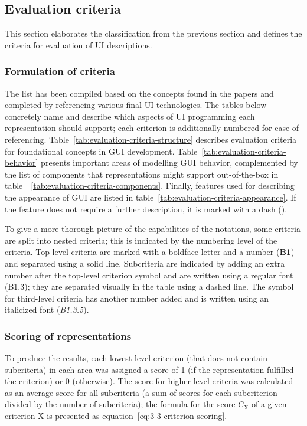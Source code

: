 \subsection{Evaluation criteria}\label{subsec:evaluation-criteria}

This section elaborates the classification from the previous section and defines the criteria for evaluation of UI descriptions.

\subsubsection{Formulation of criteria}
The list has been compiled based on the concepts found in the papers and completed by referencing various final UI technologies.
The tables below concretely name and describe which aspects of UI programming each representation should support;
each criterion is additionally numbered for ease of referencing.
Table~\ref{tab:evaluation-criteria-structure} describes evaluation criteria for foundational concepts in GUI development.
Table~\ref{tab:evaluation-criteria-behavior} presents important areas of modelling GUI behavior, complemented by the list of components that representations might support out-of-the-box in table~~\ref{tab:evaluation-criteria-components}.
Finally, features used for describing the appearance of GUI are listed in table~\ref{tab:evaluation-criteria-appearance}.
If the feature does not require a further description, it is marked with a dash (\textemdash).

To give a more thorough picture of the capabilities of the notations, some criteria are split into nested criteria;
this is indicated by the numbering level of the criteria.
Top-level criteria are marked with a boldface letter and a number (\textbf{B1}) and separated using a solid line.
Subcriteria are indicated by adding an extra number after the top-level criterion symbol and are written using a regular font (B1.3);
they are separated visually in the table using a dashed line.
The symbol for third-level criteria has another number added and is written using an italicized font (\textit{B1.3.5}).

\subsubsection{Scoring of representations}
To produce the results, each lowest-level criterion (that does not contain subcriteria) in each area was assigned a score of 1 (if the representation fulfilled the criterion) or 0 (otherwise).
The score for higher-level criteria was calculated as an average score for all subcriteria (a sum of scores for each subcriterion divided by the number of subcriteria);
the formula for the score $C_\text{X}$ of a given criterion X is presented as  equation~\ref{eq:3-3-criterion-scoring}.

